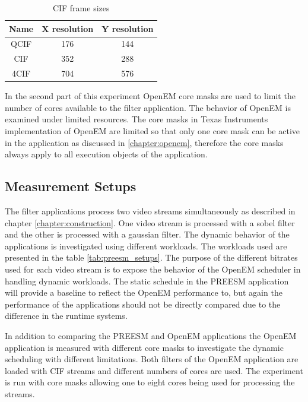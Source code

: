 \begin{table}
    \begin{center}
        \begin{tabular}{ c c c }
            Name  & X resolution  & Y resolution \\ \hline
            QCIF  & 176           & 144          \\ \hline
            CIF   & 352           & 288          \\ \hline
            4CIF  & 704           & 576          \\ \hline
        \end{tabular}
        \caption{CIF frame sizes}
        \label{tab:cif_frames}
    \end{center}
\end{table}

In the second part of this experiment OpenEM core masks are used to limit the
number of cores available to the filter application. The behavior of OpenEM is
examined under limited resources. The core masks in Texas Instruments
implementation of OpenEM are limited so that only one core mask can be active in
the application as discussed in \ref{chapter:openem}, therefore the core masks
always apply to all execution objects of the application.

\subsection{Measurement Setups}
The filter applications process two video streams simultaneously as described in
chapter \ref{chapter:construction}. One video stream is processed with a sobel
filter and the other is processed with a gaussian filter. The dynamic behavior
of the applications is investigated using different workloads. The workloads
used are presented in the table \ref{tab:preesm_setups}. The purpose of the
different bitrates used for each video stream is to expose the behavior of the
OpenEM scheduler in handling dynamic workloads. The static schedule in the
PREESM application will provide a baseline to reflect the OpenEM performance to,
but again the performance of the applications should not be directly compared
due to the difference in the runtime systems.

In addition to comparing the PREESM and OpenEM applications the OpenEM
application is measured with different core masks to investigate the dynamic
scheduling with different limitations. Both filters of the OpenEM application
are loaded with CIF streams and different numbers of cores are used. The
experiment is run with core masks allowing one to eight cores being used for
processing the streams.

